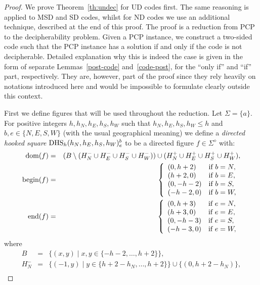 \documentclass[final,nomarks]{dmtcs-episciences}
\newcommand{\dfplus}[1]{#1^{\diamond}}
\newcommand{\dfbegin}[1]{\mbox{\rm begin}(#1)}
\newcommand{\dfend}[1]{\mbox{\rm end}(#1)}
\newcommand{\dfdomain}[1]{\mbox{\rm dom}(#1)}
\newcommand{\DHSh}[7]{\mbox{\rm DHS}_#1(#2,#3,#4,#5)^{#6}_{#7}}\newcommand{\DHS}[6]{\mbox{\rm DHS}(#1,#2,#3,#4)^{#5}_{#6}}
\begin{document}
\begin{proof}
We prove Theorem~\ref{th:undec} for UD codes first. The same reasoning is applied 
to MSD and SD codes, whilst for ND codes we use an additional technique,
described at the end of this proof. The proof is a reduction from
PCP to the decipherability problem. Given a PCP instance, we construct a two-sided
code such that the PCP instance has a solution if and only if the code is not decipherable.
Detailed explanation why this is indeed the case is given in the form of separate
Lemmas~\ref{post-code} and~\ref{code-post}, for the ``only if'' and ``if'' part, respectively.
They are, however, part of the proof since they rely heavily on
notations introduced here and would be impossible to formulate clearly
outside this context.

First we define figures that will be used throughout the reduction.
Let $\Sigma=\{a\}$.
For positive integers $h,h_N,h_E,h_S,h_W$ such that $h_N,h_E,h_S,h_W \leq h$ 
and $b,e\in\{N,E,S,W\}$ (with the usual geographical meaning) we define 
a \emph{directed hooked square} $\DHSh{h}{h_N}{h_E}{h_S}{h_W}{b}{e}$
to be a directed figure $f\in\dfplus{\Sigma}$ with:
\begin{eqnarray*}
	\dfdomain{f}&=&(B\setminus
	(H_N^-\cup H_E^-\cup H_S^-\cup H_W^-))\cup
	(H_N^+\cup H_E^+\cup H_S^+\cup H_W^+),\\
	\dfbegin{f}&=&\left\{
		\begin{array}{ll}
   		(0,h+2)&\mbox{if }b=N,\\
   		(h+2,0)&\mbox{if }b=E,\\
   		(0,-h-2)&\mbox{if }b=S,\\
   		(-h-2,0)&\mbox{if }b=W,\\
   	\end{array}\right.\\
	\dfend{f}&=&\left\{
		\begin{array}{ll}
   		(0,h+3)&\mbox{if }e=N,\\
   		(h+3,0)&\mbox{if }e=E,\\
   		(0,-h-3)&\mbox{if }e=S,\\
   		(-h-3,0)&\mbox{if }e=W,\\
   	\end{array}\right.
\end{eqnarray*}
where
\begin{eqnarray*}
	B&=&\{(x,y)\mid x,y\in\{-h-2,\ldots,h+2\}\},\\
H_N^-&=&\{(-1,y)\mid y\in\{h+2-h_N,\ldots,h+2\}\}\cup\{(0,h+2-h_N)\},\\

\end{eqnarray*}
\end{proof}
\end{document}
